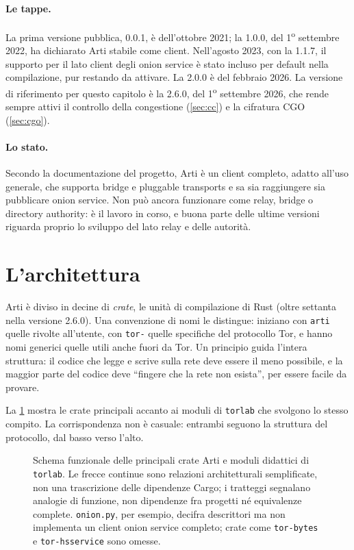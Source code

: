 \paragraph{Le tappe.} La prima versione pubblica, 0.0.1, è dell'ottobre 2021; la 1.0.0, del 1\textsuperscript{o} settembre 2022, ha dichiarato Arti stabile come client. Nell'agosto 2023, con la 1.1.7, il supporto per il lato client degli onion service è stato incluso per default nella compilazione, pur restando da attivare. La 2.0.0 è del febbraio 2026. La versione di riferimento per questo capitolo è la 2.6.0, del 1\textsuperscript{o} settembre 2026, che rende sempre attivi il controllo della congestione (\cref{sec:cc}) e la cifratura CGO (\cref{sec:cgo}).

\paragraph{Lo stato.} Secondo la documentazione del progetto, Arti è un client completo, adatto all'uso generale, che supporta bridge e pluggable transports e sa sia raggiungere sia pubblicare onion service. Non può ancora funzionare come relay, bridge o directory authority: è il lavoro in corso, e buona parte delle ultime versioni riguarda proprio lo sviluppo del lato relay e delle autorità.

\section{L'architettura}\label{sec:arti-architettura}

Arti è diviso in decine di \emph{crate}, le unità di compilazione di Rust (oltre settanta nella versione 2.6.0). Una convenzione di nomi le distingue: iniziano con \texttt{arti} quelle rivolte all'utente, con \texttt{tor-} quelle specifiche del protocollo Tor, e hanno nomi generici quelle utili anche fuori da Tor. Un principio guida l'intera struttura: il codice che legge e scrive sulla rete deve essere il meno possibile, e la maggior parte del codice deve \enquote{fingere che la rete non esista}, per essere facile da provare.

La \cref{fig:crate} mostra le crate principali accanto ai moduli di \texttt{torlab} che svolgono lo stesso compito. La corrispondenza non è casuale: entrambi seguono la struttura del protocollo, dal basso verso l'alto.

\begin{figure}[htbp]
\centering

\caption{Schema funzionale delle principali crate Arti e moduli didattici di \texttt{torlab}. Le frecce continue sono relazioni architetturali semplificate, non una trascrizione delle dipendenze Cargo; i tratteggi segnalano analogie di funzione, non dipendenze fra progetti né equivalenze complete. \texttt{onion.py}, per esempio, decifra descrittori ma non implementa un client onion service completo; crate come \texttt{tor-bytes} e \texttt{tor-hsservice} sono omesse.}
\label{fig:crate}
\end{figure}

